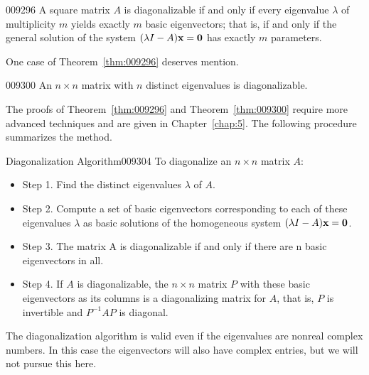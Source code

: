 \begin{theorem}{}{009296}
A  square matrix $A$ is diagonalizable if and only if every eigenvalue $\lambda$ of 
multiplicity $m$ yields exactly $m$ basic eigenvectors; that is, if and only
 if the general solution of the system $(\lambda I - A)\textbf{x} = \textbf{0}$ has exactly $m$ parameters.
\end{theorem}

\noindent One case of Theorem~\ref{thm:009296} deserves mention.


\begin{theorem}{}{009300}
An $n \times n$ matrix with $n$ distinct eigenvalues is diagonalizable.
\end{theorem}

\noindent The proofs of Theorem~\ref{thm:009296} and Theorem~\ref{thm:009300} require more advanced techniques and are given in Chapter~\ref{chap:5}. The following procedure summarizes the method.

\begin{theorem*}{Diagonalization Algorithm}{009304}
To diagonalize an $n \times n$ matrix $A$:


\begin{itemize}[leftmargin=1em]
\item[] Step 1. Find the distinct eigenvalues $\lambda$ of $A$.

\item[] Step 2. Compute a set of basic eigenvectors corresponding to each of these 
eigenvalues $\lambda$ as basic solutions of the homogeneous system $(\lambda I - A)\textbf{x} = \textbf{0}$.

\item[] Step 3. The matrix A is diagonalizable if and only if there are n basic eigenvectors in all.

\item[] Step 4. If $A$ is diagonalizable, the $n \times n$ matrix $P$ with these basic 
eigenvectors as its columns is a diagonalizing matrix for $A$, that is, $P$ 
is invertible and $P^{-1}AP$ is diagonal.
\end{itemize}
\end{theorem*}

\noindent The diagonalization algorithm is valid even if the eigenvalues are nonreal 
complex numbers. In this case the eigenvectors will also have complex 
entries, but we will not pursue this here.


